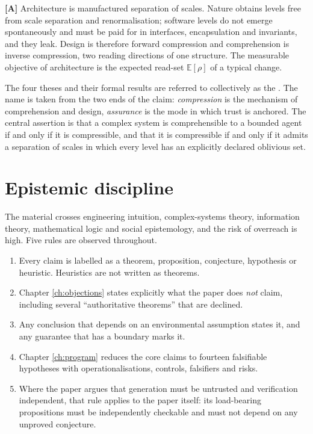 \begin{principle}[Design]\label{th:design}\textbf{[A]}
Architecture is manufactured separation of scales. Nature obtains levels free from scale
separation and renormalisation; software levels do not emerge spontaneously and must be
paid for in interfaces, encapsulation and invariants, and they leak. Design is therefore
forward compression and comprehension is inverse compression, two reading directions of
one structure. The measurable objective of architecture is the expected read-set
$\mathbb{E}[\rho]$ of a typical change.
\end{principle}

The four theses and their formal results are referred to collectively as the
. The name is taken from the two ends of the claim:
\emph{compression} is the mechanism of comprehension and design, \emph{assurance} is the
mode in which trust is anchored. The central assertion is that a complex system is
comprehensible to a bounded agent if and only if it is compressible, and that it is
compressible if and only if it admits a separation of scales in which every level has an
explicitly declared oblivious set.

\section{Epistemic discipline}

The material crosses engineering intuition, complex-systems theory, information theory,
mathematical logic and social epistemology, and the risk of overreach is high. Five rules
are observed throughout.

\begin{enumerate}[label=(\roman*)]
\item {} Every claim is labelled as a theorem, proposition,
      conjecture, hypothesis or heuristic. Heuristics are not written as theorems.
\item {} Chapter \ref{ch:objections} states explicitly what the paper
      does \emph{not} claim, including several ``authoritative theorems'' that are declined.
\item {} Any conclusion that depends on an environmental
      assumption states it, and any guarantee that has a boundary marks it.
\item {} Chapter \ref{ch:program} reduces the core claims to fourteen
      falsifiable hypotheses with operationalisations, controls, falsifiers and risks.
\item {} Where the paper argues that
      generation must be untrusted and verification independent, that rule applies to the
      paper itself: its load-bearing propositions must be independently checkable and must
      not depend on any unproved conjecture.
\end{enumerate}

